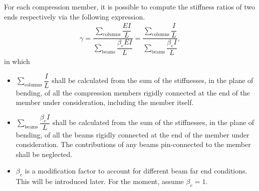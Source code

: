 For each compression member, it is possible to compute the stiffness ratios of two ends respectively via the following expression.
\begin{gather}\label{eq:be}
\gamma=\dfrac{\displaystyle\sum_{\text{columns}}\dfrac{EI}{L}}{\displaystyle\sum_{\text{beams}}\dfrac{\beta_eEI}{L}}=\dfrac{\displaystyle\sum_{\text{columns}}\dfrac{I}{L}}{\displaystyle\sum_{\text{beams}}\dfrac{\beta_eI}{L}},
\end{gather}
in which
\begin{itemize}
\item {} $\displaystyle\sum_{\text{columns}}\dfrac{I}{L}$ shall be calculated from the sum of the stiffnesses, in the plane of bending, of all the compression members rigidly connected at the end of the member under consideration, including the member itself.
\item {} $\displaystyle\sum_{\text{beams}}\dfrac{\beta_eI}{L}$ shall be calculated from the sum of the stiffnesses, in the plane of bending, of all the beams rigidly connected at the end of the member under consideration. The contributions of any beams pin-connected to the member shall be neglected.
\item $\beta_e$ is a modification factor to account for different beam far end conditions. This will be introduced later. For the moment, assume $\beta_e=1$.
\end{itemize}

